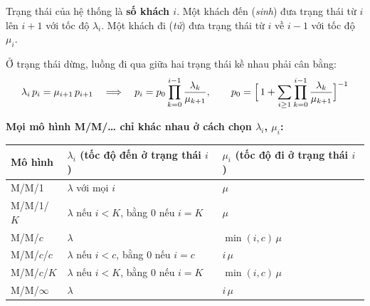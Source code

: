 Trạng thái của hệ thống là \textbf{số khách $i$}. Một khách đến (\emph{sinh}) đưa trạng thái từ $i$ lên $i+1$ với tốc độ $\lambda_i$. Một khách đi (\emph{tử}) đưa trạng thái từ $i$ về $i-1$ với tốc độ $\mu_i$.


\begin{congthuc}
Ở trạng thái dừng, luồng đi qua giữa hai trạng thái kề nhau phải cân bằng:
\[
\lambda_{i}\,p_{i} = \mu_{i+1}\,p_{i+1}
\quad\Longrightarrow\quad
p_i = p_0\prod_{k=0}^{i-1}\frac{\lambda_k}{\mu_{k+1}},
\qquad
p_0 = \Bigl[\,1+\sum_{i\ge 1}\prod_{k=0}^{i-1}\frac{\lambda_k}{\mu_{k+1}}\Bigr]^{-1}
\]
\end{congthuc}

\textbf{Mọi mô hình M/M/\dots{} chỉ khác nhau ở cách chọn $\lambda_i$, $\mu_i$:}
\begin{center}
\begin{tabular}{@{}lll@{}}
\toprule
\textbf{Mô hình} & \textbf{$\lambda_i$ (tốc độ đến ở trạng thái $i$)} & \textbf{$\mu_i$ (tốc độ đi ở trạng thái $i$)} \\
\midrule
M/M/1 & $\lambda$ với mọi $i$ & $\mu$ \\
M/M/1/$K$ & $\lambda$ nếu $i<K$, bằng $0$ nếu $i=K$ & $\mu$ \\
M/M/$c$ & $\lambda$ & $\min(i,c)\,\mu$ \\
M/M/$c$/$c$ & $\lambda$ nếu $i<c$, bằng $0$ nếu $i=c$ & $i\,\mu$ \\
M/M/$c$/$K$ & $\lambda$ nếu $i<K$, bằng $0$ nếu $i=K$ & $\min(i,c)\,\mu$ \\
M/M/$\infty$ & $\lambda$ & $i\,\mu$ \\
\bottomrule
\end{tabular}
\end{center}
